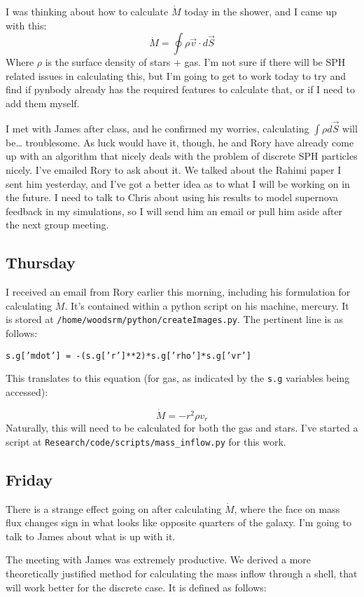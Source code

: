 \documentclass[11pt,letterpaper]{article}
\begin{document}
I was thinking about how to calculate $\dot M$ today in the shower, and
I came up with this: \[\dot M = \oint \rho \vec v \cdot d\vec S\] Where
$\rho$ is the surface density of stars + gas. I'm not sure if there will
be SPH related issues in calculating this, but I'm going to get to work
today to try and find if pynbody already has the required features to
calculate that, or if I need to add them myself.

I met with James after class, and he confirmed my worries, calculating
$\int\rho d\vec S$ will be\ldots{} troublesome. As luck would have it,
though, he and Rory have already come up with an algorithm that nicely
deals with the problem of discrete SPH particles nicely. I've emailed
Rory to ask about it. We talked about the Rahimi paper I sent him
yesterday, and I've got a better idea as to what I will be working on in
the future. I need to talk to Chris about using his results to model
supernova feedback in my simulations, so I will send him an email or
pull him aside after the next group meeting.

\subsection{Thursday}

I received an email from Rory earlier this morning, including his
formulation for calculating $\dot M$. It's contained within a python
script on his machine, mercury. It is stored at
\verb!/home/woodsrm/python/createImages.py!. The pertinent line is as
follows:

\texttt{s.g{[}'mdot'{]} = -(s.g{[}'r'{]}**2)*s.g{[}'rho'{]}*s.g{[}'vr'{]}}

This translates to this equation (for gas, as indicated by the
\verb!s.g! variables being accessed):

\[\dot M = -r^2\rho v_r\] Naturally, this will need to be calculated for
both the gas and stars. I've started a script at
\verb!Research/code/scripts/mass_inflow.py! for this work.

\subsection{Friday}

There is a strange effect going on after calculating $\dot M$, where the
face on mass flux changes sign in what looks like opposite quarters of
the galaxy. I'm going to talk to James about what is up with it.

The meeting with James was extremely productive. We derived a more
theoretically justified method for calculating the mass inflow through a
shell, that will work better for the discrete case. It is defined as
follows:
\end{document}
